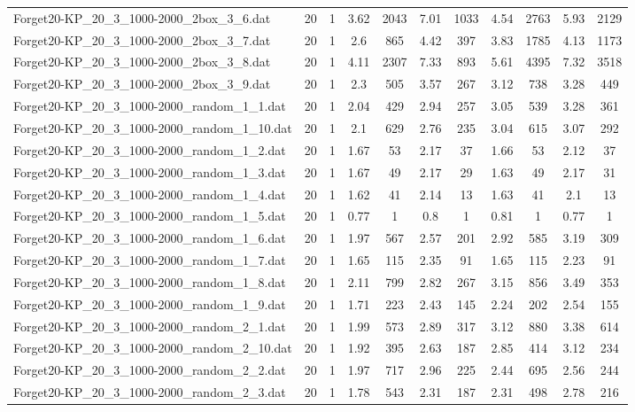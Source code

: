 \begin{table}[!ht]
\begin{tabular}{lcccccccccc}
Forget20-KP\_20\_3\_1000-2000\_2box\_3\_6.dat & 20 & 1 & 3.62 & 2043 & 7.01 & 1033 & 4.54 & 2763 & 5.93 & 2129 \\
Forget20-KP\_20\_3\_1000-2000\_2box\_3\_7.dat & 20 & 1 & 2.6 & 865 & 4.42 & 397 & 3.83 & 1785 & 4.13 & 1173 \\
Forget20-KP\_20\_3\_1000-2000\_2box\_3\_8.dat & 20 & 1 & 4.11 & 2307 & 7.33 & 893 & 5.61 & 4395 & 7.32 & 3518 \\
Forget20-KP\_20\_3\_1000-2000\_2box\_3\_9.dat & 20 & 1 & 2.3 & 505 & 3.57 & 267 & 3.12 & 738 & 3.28 & 449 \\
Forget20-KP\_20\_3\_1000-2000\_random\_1\_1.dat & 20 & 1 & 2.04 & 429 & 2.94 & 257 & 3.05 & 539 & 3.28 & 361 \\
Forget20-KP\_20\_3\_1000-2000\_random\_1\_10.dat & 20 & 1 & 2.1 & 629 & 2.76 & 235 & 3.04 & 615 & 3.07 & 292 \\
Forget20-KP\_20\_3\_1000-2000\_random\_1\_2.dat & 20 & 1 & 1.67 & 53 & 2.17 & 37 & 1.66 & 53 & 2.12 & 37 \\
Forget20-KP\_20\_3\_1000-2000\_random\_1\_3.dat & 20 & 1 & 1.67 & 49 & 2.17 & 29 & 1.63 & 49 & 2.17 & 31 \\
Forget20-KP\_20\_3\_1000-2000\_random\_1\_4.dat & 20 & 1 & 1.62 & 41 & 2.14 & 13 & 1.63 & 41 & 2.1 & 13 \\
Forget20-KP\_20\_3\_1000-2000\_random\_1\_5.dat & 20 & 1 & 0.77 & 1 & 0.8 & 1 & 0.81 & 1 & 0.77 & 1 \\
Forget20-KP\_20\_3\_1000-2000\_random\_1\_6.dat & 20 & 1 & 1.97 & 567 & 2.57 & 201 & 2.92 & 585 & 3.19 & 309 \\
Forget20-KP\_20\_3\_1000-2000\_random\_1\_7.dat & 20 & 1 & 1.65 & 115 & 2.35 & 91 & 1.65 & 115 & 2.23 & 91 \\
Forget20-KP\_20\_3\_1000-2000\_random\_1\_8.dat & 20 & 1 & 2.11 & 799 & 2.82 & 267 & 3.15 & 856 & 3.49 & 353 \\
Forget20-KP\_20\_3\_1000-2000\_random\_1\_9.dat & 20 & 1 & 1.71 & 223 & 2.43 & 145 & 2.24 & 202 & 2.54 & 155 \\
Forget20-KP\_20\_3\_1000-2000\_random\_2\_1.dat & 20 & 1 & 1.99 & 573 & 2.89 & 317 & 3.12 & 880 & 3.38 & 614 \\
Forget20-KP\_20\_3\_1000-2000\_random\_2\_10.dat & 20 & 1 & 1.92 & 395 & 2.63 & 187 & 2.85 & 414 & 3.12 & 234 \\
Forget20-KP\_20\_3\_1000-2000\_random\_2\_2.dat & 20 & 1 & 1.97 & 717 & 2.96 & 225 & 2.44 & 695 & 2.56 & 244 \\
Forget20-KP\_20\_3\_1000-2000\_random\_2\_3.dat & 20 & 1 & 1.78 & 543 & 2.31 & 187 & 2.31 & 498 & 2.78 & 216 \\

\end{tabular}
\end{table}
